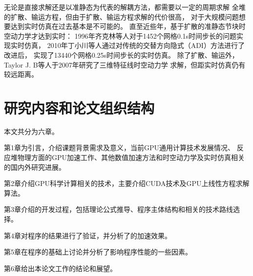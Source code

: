 无论是直接求解还是以准静态为代表的解耦方法，都需要以一定的周期求解
全堆的扩散、输运方程，但由于扩散、输运方程求解的代价很高，
对于大规模问题想要达到实时仿真在过去基本是不可能的。
直至近些年，基于扩散的准静态节块时空动力学才达到实时：
1996年齐克林等人\cite{qikelin1996}对于1452个网格0.1s时间步长的问题实现实时仿真，
2010年丁小川等人\cite{dingxiaochuan2011}通过对传统的交替方向隐式（ADI）方法进行了改进后，
实现了13440个网格0.25s时间步长的实时仿真。
除了扩散、输运外，Taylor J. B等人\cite{taylor2007development}于2007年研究了三维特征线时空动力学
求解，但距实时仿真仍有较远距离。


\section{研究内容和论文组织结构}

本文共分为六章。

第1章为引言，介绍课题背景需求及意义，当前GPU通用计算技术发展情况、
反应堆物理方面的GPU加速工作、其他数值加速方法和时空动力学及实时仿真相关的国内外研究进展。

第2章介绍GPU科学计算相关的技术，主要介绍CUDA技术及GPU上线性方程求解算法。

第3章介绍\ProgramName 的开发过程，包括理论公式推导、程序主体结构和相关的技术路线选择。

第4章对\ProgramName 程序的结果进行了验证，并分析了\ProgramName 的加速效果。

第5章在\ProgramName 程序的基础上讨论并分析了影响程序性能的一些因素。

第6章给出本论文工作的结论和展望。